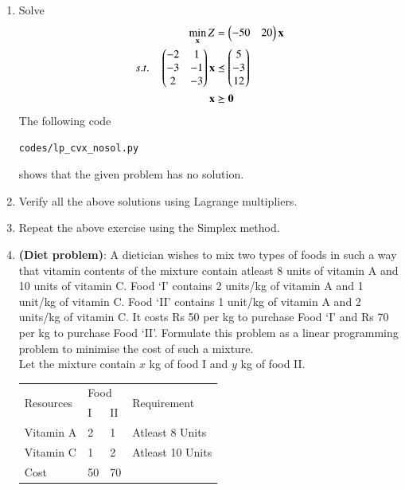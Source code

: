 \begin{enumerate}[label=\arabic*.,ref=\thesection.\theenumi]
\item Solve
\begin{align}
\min_{\mathbf{x}} Z &= \begin{pmatrix}-50 & 20\end{pmatrix}\mathbf{x}
\\
s.t. \quad 
\begin{pmatrix}
-2 & 1
\\
-3 & -1
\\
2 & -3
\end{pmatrix}
\mathbf{x} &\preceq \begin{pmatrix}5\\-3\\12\end{pmatrix}
\\
\mathbf{x} &\succeq \mathbf{0}
\end{align}
%
\solution The following code 
\begin{lstlisting}
codes/lp_cvx_nosol.py
\end{lstlisting}
%
shows that the given problem has no solution.
\item Verify all the above solutions using Lagrange multipliers.
\item Repeat the above exercise using the Simplex method.
\item\textbf {(Diet problem)}: A dietician wishes to mix two types of foods in such a
way that vitamin contents of the mixture contain atleast 8 units of vitamin A and 10
units of vitamin C. Food ‘I’ contains 2 units/kg of vitamin A and 1 unit/kg of vitamin C.
Food ‘II’ contains 1 unit/kg of vitamin A and 2 units/kg of vitamin C. It costs
Rs 50 per kg to purchase Food ‘I’ and Rs 70 per kg to purchase Food ‘II’. Formulate
this problem as a linear programming problem to minimise the cost of such a mixture.
\\
\solution Let the mixture contain $x$ kg of food I and $y$ kg of food II.
\\
\begin{table}[!h]
\begin{tabular}{|l|l|l|l|}
\hline
\multirow{2}{*}{Resources} & \multicolumn{2}{l|}{Food} & \multirow{2}{*}{Requirement} \\ \cline{2-3}
                           & I           & II          &                              \\ \hline
Vitamin A                  & 2           & 1           & Atleast 8 Units              \\ \hline
Vitamin C                  & 1           & 2           & Atleast 10 Units             \\ \hline
Cost                       & 50          & 70          &                              \\ \hline
\end{tabular}

\end{table}
\end{enumerate}
